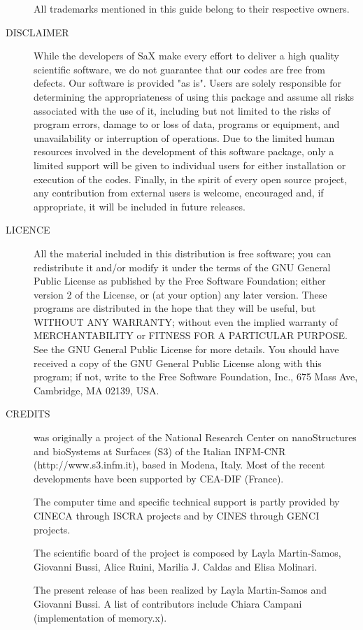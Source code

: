 \documentclass[11pt]{article}
\begin{document}
\begin{description}
All trademarks mentioned in this guide belong to their respective
owners.

\item[DISCLAIMER] While the developers of SaX make every effort to deliver a high quality scientific software, we do not guarantee that our codes are free from defects. Our software is provided "as is". Users are solely responsible for determining the appropriateness of using this package and assume all risks associated with the use of it, including but not limited to the risks of program errors, damage to or loss of data, programs or equipment, and unavailability or interruption of operations. Due to the limited human resources involved in the development of this software package, only a limited support will be given to individual users for either installation or execution of the codes.
Finally, in the spirit of every open source project, any contribution from external users is welcome, encouraged and, if appropriate, it will be included in future releases.

\item[LICENCE] All the material included in this distribution is free software; you can redistribute it and/or modify it under the terms of the GNU General Public License as published by the Free Software Foundation; either version 2 of the License, or (at your option) any later version.
These programs are distributed in the hope that they will be useful, but WITHOUT ANY WARRANTY; without even the implied warranty of MERCHANTABILITY or FITNESS FOR A PARTICULAR PURPOSE. See the GNU General Public License for more details.
You should have received a copy of the GNU General Public License along with this program; if not, write to the Free Software Foundation, Inc., 675 Mass Ave, Cambridge, MA 02139, USA.

\item[CREDITS] \SAX was originally a project of the
National Research Center on nanoStructures and bioSystems at Surfaces (S3)
of the Italian INFM-CNR (http://www.s3.infm.it), based in Modena, Italy.
Most of the recent developments have been supported by CEA-DIF (France).

The computer time and specific technical support is partly provided by CINECA through ISCRA projects and by CINES through GENCI projects.

The scientific board of the \SAX project is composed by
Layla Martin-Samos, Giovanni Bussi, Alice Ruini,
Marilia J. Caldas and Elisa Molinari.

The present release of \SAX has been realized by Layla Martin-Samos and Giovanni Bussi. A list of contributors include Chiara Campani (implementation of memory.x).


\end{description}
\end{document}

